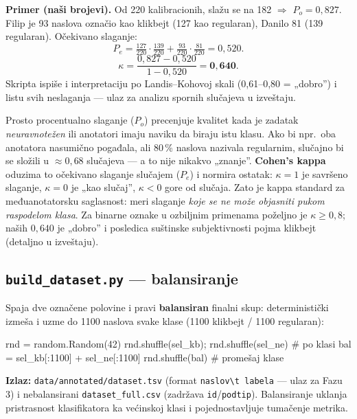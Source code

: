 \documentclass[11pt,a4paper]{article}
\newcommand{\kod}[1]{\texttt{#1}}
\begin{document}
\textbf{Primer (naši brojevi).} Od 220 kalibracionih, slažu se na 182 $\Rightarrow$
$P_o = 0{,}827$. Filip je 93 naslova označio kao klikbejt (127 kao regularan), Danilo
81 (139 regularan). Očekivano slaganje:
\[
P_e = \tfrac{127}{220}\!\cdot\!\tfrac{139}{220} + \tfrac{93}{220}\!\cdot\!\tfrac{81}{220}
= 0{,}520.
\]
\[
\kappa = \frac{0{,}827 - 0{,}520}{1 - 0{,}520} = \mathbf{0{,}640}.
\]
Skripta ispiše i interpretaciju po Landis--Kohovoj skali (0,61--0,80 = „dobro'') i
listu svih neslaganja --- ulaz za analizu spornih slučajeva u izveštaju.

\begin{teorija}
Prosto procentualno slaganje ($P_o$) precenjuje kvalitet kada je zadatak
\emph{neuravnotežen} ili anotatori imaju naviku da biraju istu klasu. Ako bi npr.\ oba
anotatora nasumično pogađala, ali 80\,\% naslova nazivala regularnim, slučajno bi se
složili u $\approx 0{,}68$ slučajeva --- a to nije nikakvo „znanje''. \textbf{Cohen's
kappa} oduzima to očekivano slaganje slučajem ($P_e$) i normira ostatak:
$\kappa=1$ je savršeno slaganje, $\kappa=0$ je „kao slučaj'', $\kappa<0$ gore od
slučaja. Zato je kappa standard za međuanotatorsku saglasnost: meri slaganje
\emph{koje se ne može objasniti pukom raspodelom klasa}. Za binarne oznake u
ozbiljnim primenama poželjno je $\kappa\ge 0{,}8$; naših $0{,}640$ je „dobro'' i
posledica suštinske subjektivnosti pojma klikbejt (detaljno u izveštaju).
\end{teorija}

\subsection{\texttt{build\_dataset.py} --- balansiranje}
Spaja dve označene polovine i pravi \textbf{balansiran} finalni skup: deterministički
izmeša i uzme do 1100 naslova svake klase (1100 klikbejt / 1100 regularan):

\begin{code}
rnd = random.Random(42)
rnd.shuffle(sel_kb); rnd.shuffle(sel_ne)   # po klasi
bal = sel_kb[:1100] + sel_ne[:1100]
rnd.shuffle(bal)                            # promešaj klase
\end{code}

\textbf{Izlaz:} \kod{data/annotated/dataset.tsv} (format \kod{naslov\textbackslash t
labela} --- ulaz za Fazu 3) i nebalansirani \kod{dataset\_full.csv} (zadržava
\kod{id}/\kod{podtip}). Balansiranje uklanja pristrasnost klasifikatora ka većinskoj
klasi i pojednostavljuje tumačenje metrika.
\end{document}
